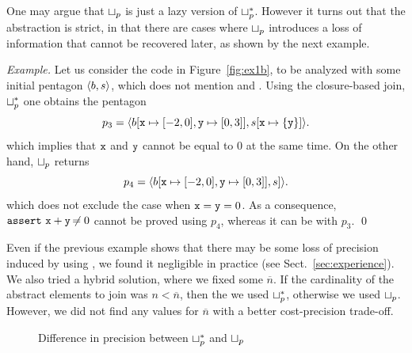 \documentclass{elsart}
\begin{document}
One may argue that  $\sqcup_p$ is just a lazy version of $\sqcup_p^*$. 
However it turns out that the abstraction is strict, in that there are cases where $\sqcup_p$ introduces a loss of information that cannot be recovered later, as shown by the next example.

\textit{Example.}
Let us consider the code in Figure~\ref{fig:ex1b}, to be analyzed with some initial pentagon $\langle b, s \rangle$, which does not mention  and .
Using the closure-based join, $\sqcup_p^*$ one obtains the pentagon
\[ 
p_3 = \langle b[\mathtt{x} \mapsto [-2, 0], \allowbreak \mathtt{y} \mapsto [0, 3]], \allowbreak s[\mathtt{x} \mapsto \{ \mathtt{y} \} ] \rangle.
\]
which implies that $\mathtt{x}$ and $\mathtt{y}$ cannot be equal to $0$ at the same time.
On the other hand, $\sqcup_p$ returns
\[
p_4 = \langle b[\mathtt{x} \mapsto [-2, 0], \allowbreak \mathtt{y} \mapsto [0,3]], \allowbreak s] \rangle.
\] 
which does not exclude the case when $\mathtt{x} = \mathtt{y} = 0$.
As a consequence, $\mathtt{assert}\ \mathtt{x} + \mathtt{y} \not\nobreak\mkern -2mu = 0$ cannot be proved using $p_4$, whereas it can be with $p_3$.
\qed

Even if the previous example shows that there may be some loss of
precision induced by using \pjoin, we found it negligible in practice
(see Sect.~\ref{sec:experience}).
We also tried a hybrid solution, where we fixed some
$\overline{n}$. If the cardinality of the abstract elements to join
was $n<\overline{n}$, then the we used $\sqcup_p^*$, otherwise we used
$\sqcup_p$. However, we did not find any values for $\overline{n}$ with
a better cost-precision trade-off.

\begin{figure}
\centering
{}
\caption{Difference in precision between $\sqcup_p^*$ and $\sqcup_p$}
\end{figure}
\end{document}
